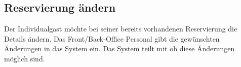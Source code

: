 \documentclass[../SubfileFeatures.tex]{subfiles}
\begin{document}
    \subsection{Reservierung ändern}
    Der Individualgast möchte bei seiner bereits vorhandenen Reservierung die Details ändern. Das Front/Back-Office Personal
    gibt die gewünschten Änderungen in das System ein. Das System teilt mit ob diese Änderungen möglich sind.
\end{document}
